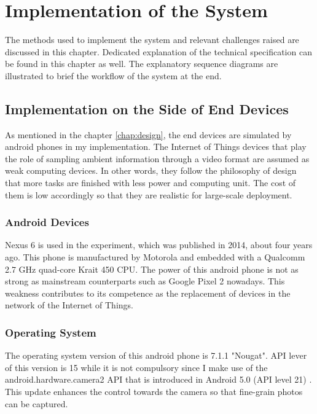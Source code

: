 \chapter{Implementation of the System} \label{chap:implementation}

The methods used to implement the system and relevant challenges raised are discussed in this chapter. Dedicated explanation of the technical specification can be found in this chapter as well. The explanatory sequence diagrams are illustrated to brief the workflow of the system at the end.

\section{Implementation on the Side of End Devices}

As mentioned in the chapter \ref{chap:design}, the end devices are simulated by android phones in my implementation. The  Internet of Things devices that play the role of sampling ambient information through a video format are assumed as weak computing devices. In other words, they follow the philosophy of design that more tasks are finished with less power and computing unit. The cost of them is low accordingly so that they are realistic for large-scale deployment.

\subsection{Android Devices}
Nexus 6 is used in the experiment, which was published in 2014, about four years ago. This phone is manufactured by Motorola and embedded with a Qualcomm 2.7 GHz quad-core Krait 450 CPU. \cite{wiki:nexus6} The power of this android phone is not as strong as mainstream counterparts such as Google Pixel 2 nowadays. This weakness contributes to its competence as the replacement of devices in the network of the Internet of Things.

\subsection{Operating System}
The operating system version of this android phone is 7.1.1 "Nougat"\cite{android-api}. API lever of this version is 15 while it is not compulsory since I make use of the android.hardware.camera2 API that is introduced in Android 5.0 (API level 21) \cite{android5.0}. This update enhances the control towards the camera so that fine-grain photos can be captured. 

